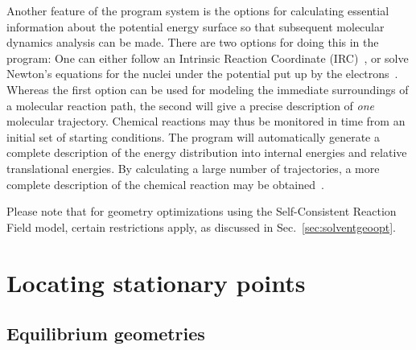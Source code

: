 Another feature of the {\dalton} program system is the options for
calculating essential information about the potential energy
surface so that subsequent molecular dynamics analysis can be
made. There are two options for doing this in the program: One can
either follow an Intrinsic Reaction Coordinate
(IRC)~\cite{pjhjajthtca73}, 
or solve Newton's equations for the nuclei under the
potential put up by the
electrons~\cite{theuhjajcpl173}. Whereas the first
option 
can be used for modeling the immediate surroundings of a
molecular reaction path, the second will give a precise
description of {\em one} molecular trajectory. Chemical reactions
may thus be monitored in time from an initial set of starting
conditions. The program will automatically generate a complete
description of the energy distribution into internal energies and
relative translational energies. By calculating a large number of
trajectories, a more complete description of the chemical reaction
may be obtained~\cite{rsgmtjdwrjbjcp106}.

Please note that for geometry optimizations using the Self-Consistent
Reaction Field model, certain restrictions apply, as discussed in
Sec.~\ref{sec:solventgeoopt}.

\section{Locating stationary points}

\subsection{Equilibrium geometries}
\label{sec:minimization}

\begin{center}
\end{center}

